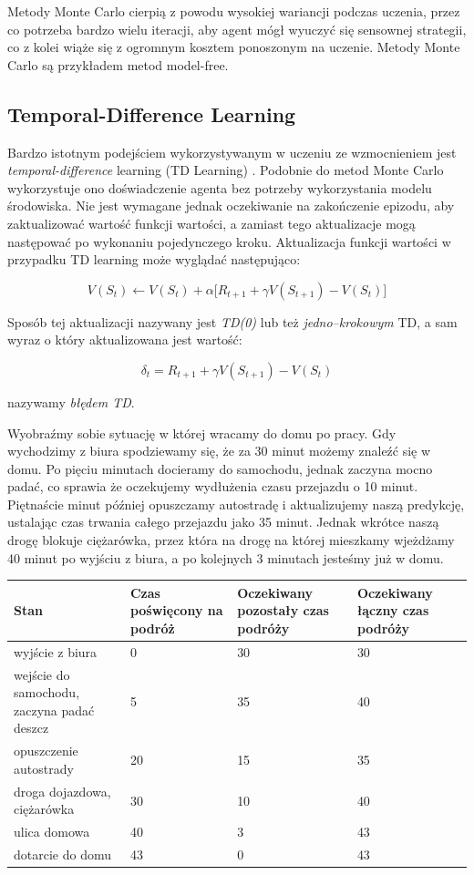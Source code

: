 \documentclass[licencjacka]{pracamgr}
\begin{document}
Metody Monte Carlo cierpią z powodu wysokiej wariancji podczas uczenia, przez co potrzeba bardzo wielu iteracji, aby agent mógł wyuczyć się sensownej strategii, co z kolei wiąże się z ogromnym kosztem ponoszonym na uczenie. Metody Monte Carlo są przykładem metod model-free.

\subsection{Temporal-Difference Learning} 

Bardzo istotnym podejściem wykorzystywanym w uczeniu ze wzmocnieniem jest \emph{temporal-difference} learning (TD Learning) \cite{TD}. Podobnie do metod Monte Carlo wykorzystuje ono doświadczenie agenta bez potrzeby wykorzystania modelu środowiska. Nie jest wymagane jednak oczekiwanie na zakończenie epizodu, aby zaktualizować wartość funkcji wartości, a zamiast tego aktualizacje mogą następować po wykonaniu pojedynczego kroku. Aktualizacja funkcji wartości w przypadku TD learning może wyglądać następująco:

$$ V(S_t) \leftarrow V(S_t) + \alpha \big[R_{t+1} + \gamma V(S_{t+1}) - V(S_t) \big] $$

Sposób tej aktualizacji nazywany jest \emph{TD(0)} lub też \emph{jedno--krokowym} TD, a sam wyraz o który aktualizowana jest wartość:

$$ \delta_t = R_{t+1} + \gamma V(S_{t+1}) - V(S_t) $$

nazywamy \emph{błędem TD}.

Wyobraźmy sobie sytuację w której wracamy do domu po pracy. Gdy wychodzimy z biura spodziewamy się, że za 30 minut możemy znaleźć się w domu. Po pięciu minutach docieramy do samochodu, jednak zaczyna mocno padać, co sprawia że oczekujemy wydłużenia czasu przejazdu o 10 minut. Piętnaście minut później opuszczamy autostradę i aktualizujemy naszą predykcję, ustalając czas trwania całego przejazdu jako 35 minut. Jednak wkrótce naszą drogę blokuje ciężarówka, przez która na drogę na której mieszkamy wjeżdżamy 40 minut po wyjściu z biura, a po kolejnych 3 minutach jesteśmy już w domu.

\begin{center}
 \begin{tabular}{ p{4cm} | p{3cm}| p{3cm} | p{3cm} } 
 \hline
 Stan & Czas poświęcony na podróż & Oczekiwany pozostały czas podróży & Oczekiwany łączny czas podróży \\ 
 \hline
 wyjście z biura & 0 & 30 & 30 \\ 
 \hline
 wejście do samochodu, zaczyna padać deszcz & 5 & 35 & 40 \\
 \hline
 opuszczenie autostrady & 20 & 15 & 35 \\
 \hline
 droga dojazdowa, ciężarówka & 30 & 10 & 40 \\
 \hline 
 ulica domowa & 40 & 3 & 43 \\
 \hline
 dotarcie do domu & 43 & 0 & 43 \\
 \hline
\end{tabular}
\end{center}
\end{document}
